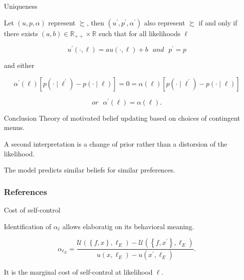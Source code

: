 \documentclass[usenames,dvipsnames,aspectratio=169,11pt, envcountsect, handout]{beamer}
\begin{document}
\begin{frame}{Uniqueness}

	\begin{newcorollary}
	\end{newcorollary}

	Let \( \left( u, p, \alpha \right) \) represent \( \succsim \), then \( \left( u^{\prime}, p^{\prime}, \alpha^{\prime} \right) \) also represent \( \succsim \) if and only if there exists \( \left( a, b \right) \in \mathbb{R}_{++} \times \mathbb{R} \) such that for all likelihoods \( \ell \)

	\[
		u^{\prime} \left( \cdot, \ell \right) = a u \left( \cdot, \ell \right) + b \: \: \: and \: \: \: p^{\prime} = p
	\]

	and either

	\[
		\alpha^{\prime} \left( \ell \right) \left[ p \left(\cdot \mid \ell^{\prime} \right) - p \left(\cdot \mid \ell \right) \right] = 0 = \alpha \left( \ell \right) \left[ p \left(\cdot \mid \ell^{\prime} \right) - p \left(\cdot \mid \ell \right) \right]
	\]

	\[
		or \: \: \: \alpha^{\prime} \left( \ell \right) = \alpha \left( \ell \right) .
	\]

\end{frame}

\begin{frame}{Conclusion}
	Theory of motivated belief updating based on choices of contingent menus.

	\vfill

	A second interpretation is a change of prior rather than a distorsion of the likelihood.

	\vfill

	The model predicts similar beliefs for similar preferences.

\end{frame}

\begin{frame}

	\frametitle{References}

	
	


\end{frame}

\appendix

\begin{frame}{Cost of self-control}

	Identification of \( \alpha_{\ell} \) allows elaboratig on its behavioral meaning.

	\vfill

	\[
		\alpha_{\ell_E} = \frac{\mathcal{U} \left( \left\{f, x \right\}, \ell_E \right) - \mathcal{U} \left( \left\{f, x^{\prime} \right\}, \ell_E \right) }{u \left( x , \ell_E \right) - u \left( x^{\prime} , \ell_E \right)} .
	\]

	\vfill

	It is the marginal cost of self-control at likelihood \( \ell \).

\end{frame}
\end{document}
